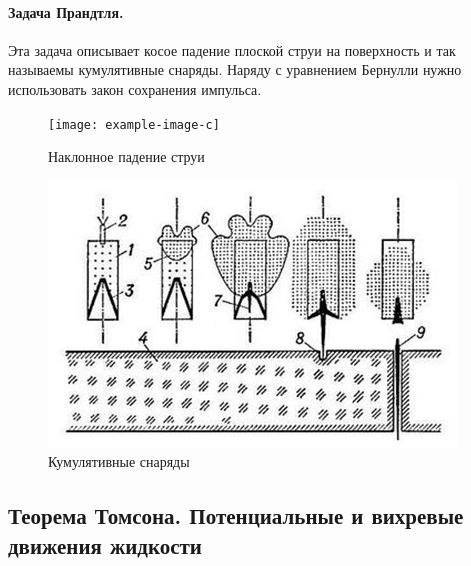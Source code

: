 \paragraph{Задача Прандтля.} Эта задача описывает косое падение плоской струи на поверхность и так называемы кумулятивные снаряды. Наряду с уравнением Бернулли нужно использовать закон сохранения импульса.
\begin{figure}[H]
	\centering
	\texttt{[image: example-image-c]}
	\caption{Наклонное падение струи}
	\label{fig:figure11}
\end{figure}
\begin{figure}[H]
	\centering
	\includegraphics[scale=1]{photo/kommu.jpg}
	\caption{Кумулятивные снаряды}
	\label{fig:figure12}
\end{figure}



\subsection{Теорема Томсона. Потенциальные и вихревые движения жидкости}

